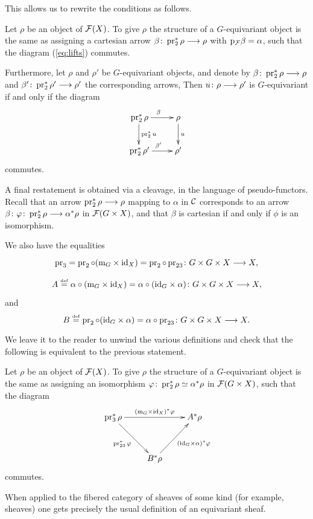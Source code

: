 \begin{3   FIBERED CATEGORIES}
\begin{3.8 Equivariant objects in fibcats}
This allows us to rewrite the conditions as follows.

\begin{proposition}
Let $\rho$ be an object of $\mathcal{F}(X)$. To give $\rho$ the structure of a  $G$-equivariant object is the same as assigning a cartesian arrow $\beta \colon  \pr_{2}^{*}\rho \arr \rho$ with $\mathrm{p}_{\mathcal{F}}\beta = \alpha$, such that the diagram (\ref{eq:lifts}) commutes.

Furthermore, let $\rho$ and $\rho'$ be $G$-equivariant objects, and denote by $\beta \colon \pr_{2}^{*}\rho \arr \rho$ and $\beta' \colon \pr_{2}^{*}\rho' \arr \rho'$ the corresponding arrows, Then $u \colon \rho \arr \rho'$ is $G$-equivariant if and only if the diagram
   \[
   \xymatrix{
   {}\pr_{2}^{*}\rho \ar[r]^{\beta} \ar[d]^{\pr_{2}^{*}u}&
   \rho              \ar[d]^{u}  \\
   {}\pr_{2}^{*}\rho' \ar[r]^{\beta'}&
   \rho'
   }
   \]
commutes.

\end{proposition}

A final restatement is obtained via a cleavage, in the language of pseudo-functors. Recall that an arrow $\pr_{2}^{*}\rho \arr \rho$ mapping to $\alpha$ in $\mathcal{C}$ corresponds to an arrow $\beta\colon \phi \colon \pr_{2}^{*}\rho \arr \alpha^{*} \rho$ in $\mathcal{F}(G \times X)$, and that $\beta$ is cartesian if and only if $\phi$ is an isomorphism.

We also have the equalities
   \[
   \xymatrix{
   \pr_{3} =
   \pr_{2} \circ (\mul_{G} \times \id_{X}) =  \pr_{2} \circ \pr_{23}
   \colon G \times G \times X \arr X,
   }
   \]
   \[
   \xymatrix{
   A \eqdef
   \alpha \circ (\mul_{G} \times \id_{X})
    = \alpha \circ (\id_{G} \times \alpha)
   \colon G \times G \times X \arr X,
   }
   \]
and
   \[
   B \eqdef 
   \pr_{2} \circ (\id_{G} \times \alpha)
    = \alpha \circ \pr_{23}
   \colon G \times G \times X \arr X.
   \]


 We leave it to the reader to unwind the various definitions and check that the following is equivalent to the previous statement.

\begin{proposition}\label{prop:definition-equivariant}
Let $\rho$ be an object of $\mathcal{F}(X)$. To give $\rho$ the structure of a  $G$-equivariant object is the same as assigning an isomorphism $\varphi \colon \operatorname{pr}_{2}^{*}\rho \simeq \alpha^{*}\rho$ in $\mathcal{F}(G \times X)$, such that the diagram
   \[
   \xymatrix@R+10pt{
   {}\pr_{3}^{*}\rho
      \ar[rr]^-{(\mul_{G} \times \id_{X})^{*}\phi}
      \ar[rd]_{\pr_{23}^{*}\phi}
   && A^{*}\rho\\
   & B^{*}\rho\ar[ru]_{(\id_{G}\times \alpha)^{*} \phi}
   }
   \]
commutes.

\end{proposition}

When applied to the fibered category of sheaves of some kind (for example, \qc sheaves) one gets precisely the usual definition of an equivariant sheaf.


\end{3.8 Equivariant objects in fibcats}
\end{3   FIBERED CATEGORIES}
